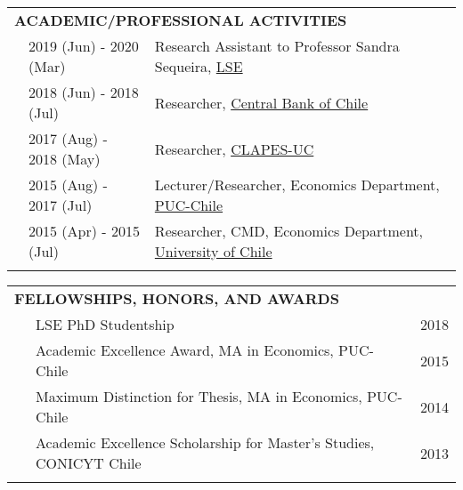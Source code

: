 \documentclass[letterpaper, 11pt]{article}
\begin{document}
\begin{tabular}{lll}
	
	\multicolumn{3}{l}{\textbf{ACADEMIC/PROFESSIONAL ACTIVITIES}} \\ [1ex]

	& 2019 (Jun) - 2020 (Mar) & Research Assistant to Professor Sandra Sequeira, \href{https://www.lse.ac.uk/}{LSE} \\
	& 2018 (Jun) - 2018 (Jul) 		& Researcher, \href{https://www.bcentral.cl/en/home}{Central Bank of Chile} \\
	& 2017 (Aug) - 2018 (May) 		& Researcher, \href{https://clapesuc.cl/}{CLAPES-UC} \\
	& 2015 (Aug) - 2017 (Jul) & Lecturer/Researcher, Economics Department,  \href{http://economia.uc.cl/}{PUC-Chile} \\
	& 2015 (Apr) - 2015 (Jul) & Researcher, CMD, Economics Department, \href{http://www.microdatos.cl/}{University of Chile} \\
	&	&	\\
	
\end{tabular}


\begin{tabular}{lll}

	
	\multicolumn{3}{l}{\textbf{FELLOWSHIPS, HONORS, AND AWARDS}} \\ [1ex]
	\parbox{0.9cm}{\ } & LSE PhD Studentship & 2018 \\
					   & Academic Excellence Award, MA in Economics, PUC-Chile & 2015 \\
					   & Maximum Distinction for Thesis, MA in Economics, PUC-Chile & 2014 \\
					   & Academic Excellence Scholarship for Master’s Studies, CONICYT Chile & 2013 \\
					   &										& \\
	
\end{tabular}

\end{document}
